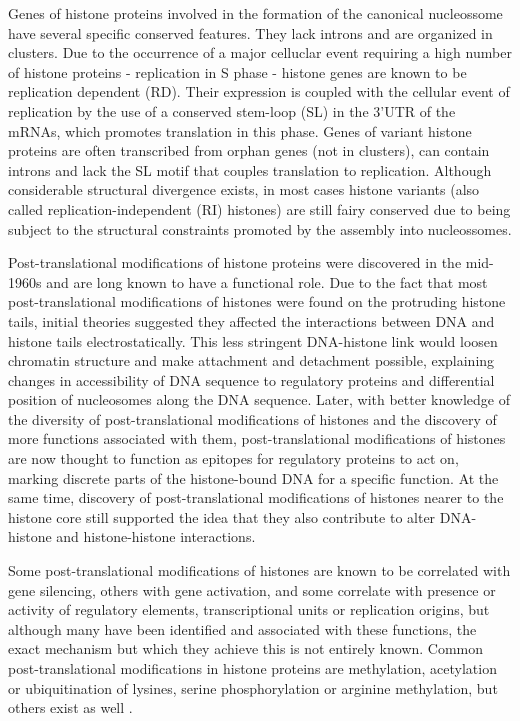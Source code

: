 \documentclass[11pt,twoside,a4paper]{report}
\begin{document}
	Genes of histone proteins involved in the formation of the canonical nucleossome have several specific conserved features. They lack introns and are organized in clusters. Due to the occurrence of a major celluclar event requiring a high number of histone proteins - replication in S phase - histone genes are known to be replication dependent (RD). Their expression is coupled with the cellular event of replication by the use of a conserved stem-loop (SL) in the 3’UTR of the mRNAs, which promotes translation in this phase. Genes of variant histone proteins are often transcribed from orphan genes (not in clusters), can contain introns and lack the SL motif that couples translation to replication. Although considerable structural divergence exists, in most cases histone variants (also called replication-independent (RI) histones) are still fairy conserved due to being subject to the structural constraints promoted by the assembly into nucleossomes.
			
	Post-translational modifications of histone proteins were discovered in the mid-1960s and are long known to have a functional role. Due to the fact that most post-translational modifications of histones were found on the protruding histone tails, initial theories suggested they affected the interactions between DNA and histone tails electrostatically. This less stringent DNA-histone link would loosen chromatin structure and make attachment and detachment possible, explaining changes in accessibility of DNA sequence to regulatory proteins and differential position of nucleosomes along the DNA sequence. Later, with better knowledge of the diversity of post-translational modifications of histones and the discovery of more functions associated with them, post-translational modifications of histones are now thought to function as epitopes for regulatory proteins to act on, marking discrete parts of the histone-bound DNA for a specific function. At the same time, discovery of post-translational modifications of histones nearer to the histone core still supported the idea that they also contribute to alter DNA-histone and histone-histone interactions.
	 
	Some post-translational modifications of histones are known to be correlated with gene silencing, others with gene activation, and some correlate with presence or activity of regulatory elements, transcriptional units or replication origins, but although many have been identified and associated with these functions, the exact mechanism but which they achieve this is not entirely known. Common post-translational modifications in histone proteins are methylation, acetylation or ubiquitination of lysines, serine phosphorylation or arginine methylation, but others exist as well  \cite{Strahl2000a} \cite{Kouzarides2007} \cite{Bannister2011}.
	 
\end{document}
